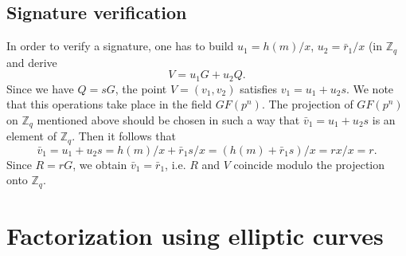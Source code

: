 \par
\subsection{Signature verification}

In order to verify a signature, one has to build $u_1=h(m)/x$, $u_2=\bar r_1/x$ (in ${\mathbb Z}_q$ and derive
$$ V=u_1G+u_2Q .
$$
Since we have $Q=sG$, the point $V=(v_1,v_2)$ satisfies $v_1=u_1+u_2s$. We note that this operations take place in the field $GF(p^n)$. The projection of $GF(p^n)$ on ${\mathbb Z}_q$ mentioned above should be chosen in such a way that $\bar v_1=u_1+u_2s$ is an element of ${\mathbb Z}_q$. Then it follows that
$$ \bar v_1=u_1+u_2s=h(m)/x+\bar r_1 s/x=(h(m)+\bar r_1s)/x=rx/x=r .
$$
Since $R=rG$, we obtain $\bar v_1=\bar r_1$, i.e. $R$ and $V$ coincide modulo the projection onto ${\mathbb Z}_q$.


\hypertarget{faktell}{}
\section{Factorization using elliptic curves} \label{ECC-Factorization}

